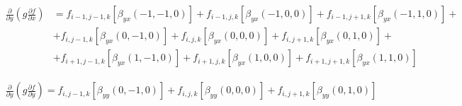 \begin{equation*}
    \begin{split}
        \frac
            {\partial}
            {\partial y}
        \left(
            g
            \frac
                {\partial f}
                {\partial x}
        \right)
        &
        =
        f_{i-1, j-1, k}
        \left[
            \beta_{yx} \left(-1, -1, 0\right)
        \right]
        +
        f_{i-1, j, k}
        \left[
            \beta_{yx} \left(-1, 0, 0\right)
        \right]
        +
        f_{i-1, j+1, k}
        \left[
            \beta_{yx} \left(-1, 1, 0\right)
        \right]
        +
        \\
        &
        +
        f_{i, j-1, k}
        \left[
            \beta_{yx} \left(0, -1, 0\right)
        \right]
        +
        f_{i, j, k}
        \left[
            \beta_{yx} \left(0, 0, 0\right)
        \right]
        +
        f_{i, j+1, k}
        \left[
            \beta_{yx} \left(0, 1, 0\right)
        \right]
        +
        \\
        &
        +
        f_{i+1, j-1, k}
        \left[
            \beta_{yx} \left(1, -1, 0\right)
        \right]
        +
        f_{i+1, j, k}
        \left[
            \beta_{yx} \left(1, 0, 0\right)
        \right]
        +
        f_{i+1, j+1, k}
        \left[
            \beta_{yx} \left(1, 1, 0\right)
        \right]
    \end{split}
\end{equation*}

\begin{equation*}
    \begin{split}
        \frac
            {\partial}
            {\partial y}
        \left(
            g
            \frac
                {\partial f}
                {\partial y}
        \right)
        =
        f_{i, j-1, k}
        \left[
            \beta_{yy} \left(0, -1, 0\right)
        \right]
        +
        f_{i, j, k}
        \left[
            \beta_{yy} \left(0, 0, 0\right)
        \right]
        +
        f_{i, j+1, k}
        \left[
            \beta_{yy} \left(0, 1, 0\right)
        \right]
    \end{split}
\end{equation*}

